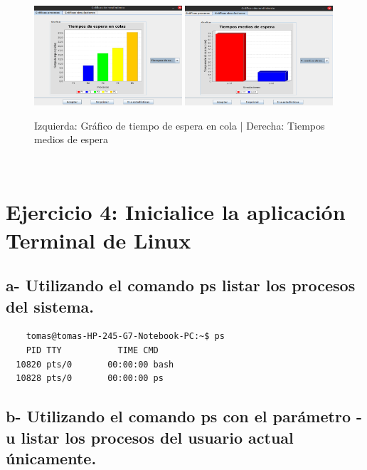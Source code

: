 \documentclass{article}
\begin{document}
\begin{figure}[h]
  \centering
  \includegraphics[width=0.49\textwidth]{resources/3dGra1.png}
  \hfill
  \includegraphics[width=0.49\textwidth]{resources/3dGra2.png}
  \caption{Izquierda: Gráfico de tiempo de espera en cola \quad | \quad Derecha: Tiempos medios de espera}
\end{figure}
\vfil


\

\section*{Ejercicio 4: Inicialice la aplicación Terminal de Linux}


\subsection*{a- Utilizando el comando ps listar los procesos del sistema.}

\begin{commandline}
	\begin{verbatim}
	tomas@tomas-HP-245-G7-Notebook-PC:~$ ps
    PID TTY           TIME CMD
  10820 pts/0       00:00:00 bash
  10828 pts/0       00:00:00 ps
	\end{verbatim}
\end{commandline}

\subsection*{b- Utilizando el comando ps con el parámetro -u listar los procesos del usuario actual únicamente.}
\end{document}
